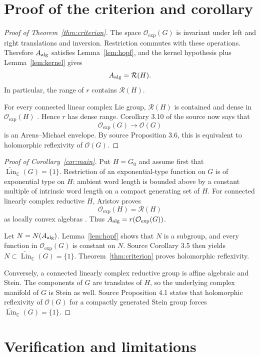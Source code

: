 \documentclass[11pt]{article}
\newcommand{\Oexp}{\mathcal O_{\mathrm{exp}}}
\newcommand{\Reg}{\mathcal R}
\newcommand{\LinB}{\widetilde{\operatorname{Lin}}_{\mathbb C}}
\begin{document}
\section{Proof of the criterion and corollary}

\begin{proof}[Proof of Theorem~\ref{thm:criterion}]
The space $\Oexp(G)$ is invariant under left and right translations and
inversion.  Restriction commutes with these operations.  Therefore
$A_{\rm alg}$ satisfies Lemma~\ref{lem:hopf}, and the kernel hypothesis plus
Lemma~\ref{lem:kernel} gives
\[
  A_{\rm alg}=\Reg(H).
\]
In particular, the range of $r$ contains $\Reg(H)$.

For every connected linear complex Lie group, $\Reg(H)$ is contained and
dense in $\Oexp(H)$ \cite[Theorem~1]{Ar23}.  Hence $r$ has dense range.
Corollary 3.10 of the source \cite{Ar21} now says that
\[
 \Oexp(G)\longrightarrow\mathcal O(G)
\]
is an Arens--Michael envelope.  By source Proposition 3.6, this is equivalent
to holomorphic reflexivity of $\mathcal O(G)$.
\end{proof}

\begin{proof}[Proof of Corollary~\ref{cor:main}]
Put $H=G_0$ and assume first that $\LinB(G)=\{1\}$.  Restriction of an
exponential-type function on $G$ is of exponential type on $H$: ambient word
length is bounded above by a constant multiple of intrinsic word length on a
compact generating set of $H$.  For connected linearly complex reductive
$H$, Aristov proves
\[
 \Oexp(H)=\Reg(H)
\]
as locally convex algebras \cite[Theorem~5.9]{Ar19}.  Thus
$A_{\rm alg}=r(\Oexp(G))$.

Let $N=N(A_{\rm alg})$.  Lemma~\ref{lem:hopf} shows that $N$ is a subgroup,
and every function in $\Oexp(G)$ is constant on $N$.  Source Corollary 3.5
then yields $N\subset\LinB(G)=\{1\}$.  Theorem~\ref{thm:criterion} proves
holomorphic reflexivity.

Conversely, a connected linearly complex reductive group is affine algebraic
and Stein.  The components of $G$ are translates of $H$, so the underlying
complex manifold of $G$ is Stein as well.  Source Proposition 4.1 states that
holomorphic reflexivity of $\mathcal O(G)$ for a compactly generated Stein
group forces $\LinB(G)=\{1\}$.
\end{proof}

\section{Verification and limitations}
\end{document}
